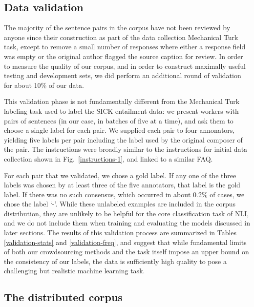 
\subsection{Data validation}

The majority of the sentence pairs in the corpus have not been reviewed by anyone since their construction as part of the data collection Mechanical Turk task, except to remove a small number of responses where either a response field was empty or the original author flagged the source caption for review. In order to measure the quality of our corpus, and in order to construct maximally useful testing and development sets, we did perform an additional round of validation for about 10\% of our data.

This validation phase is not fundamentally different from the Mechanical Turk labeling task used to label the SICK entailment data: we present workers with pairs of sentences (in our case, in batches of five at a time), and ask them to choose a single label for each pair. We supplied each pair to four annonators, yielding five labels per pair including the label used by the original composer of the pair. The instructions were broadly similar to the instructions for initial data collection shown in Fig.~\ref{instructions-1}, and linked to a similar FAQ.

For each pair that we validated, we chose a gold label. If any one of the three labels was chosen by at least three of the five annotators, that label is the gold label. If there was no such consensus, which occurred in about 0.2\% of cases, we chose the label `-'. While these unlabeled examples are included in the corpus distribution, they are unlikely to be helpful for the core classification task of NLI, and we do not include them when training and evaluating the models discussed in later sections. The results of this validation process are summarized in Tables \ref{validation-stats} and \ref{validation-freq}, and suggest that while fundamental limits of both our crowdsourcing methods and the task itself impose an upper bound on the consistency of our labels, the data is sufficiently high quality to pose a challenging but realistic machine learning task.

\subsection{The distributed corpus}


